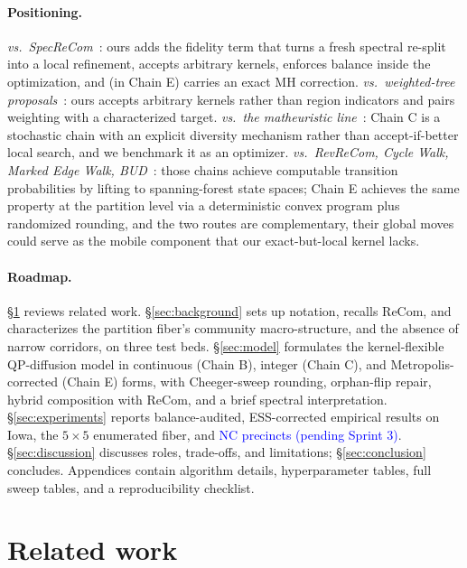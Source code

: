 \documentclass[11pt]{article}
\newcommand{\draft}[1]{\textcolor{blue}{#1}}
\begin{document}
\paragraph{Positioning.} \emph{vs.\ SpecReCom}~\cite{davies2025spectral}:
ours adds the fidelity term that turns a fresh spectral re-split into
a local refinement, accepts arbitrary kernels, enforces balance
inside the optimization, and (in Chain E) carries an exact MH
correction. \emph{vs.\ weighted-tree
proposals}~\cite{clelland2022colorado,gerrychain2024}: ours accepts
arbitrary kernels rather than region indicators and pairs weighting
with a characterized target. \emph{vs.\ the matheuristic
line}~\cite{brous2025recom,cannon2023voting}: Chain C is a stochastic
chain with an explicit diversity mechanism rather than
accept-if-better local search, and we benchmark it as an optimizer.
\emph{vs.\ RevReCom, Cycle Walk, Marked Edge Walk,
BUD}~\cite{cannon2022spanning,deford2025cycle,mcwhorter2025marked,
akitaya2026bud}: those chains achieve computable transition
probabilities by lifting to spanning-forest state spaces; Chain E
achieves the same property at the partition level via a deterministic
convex program plus randomized rounding, and the two routes are
complementary, their global moves could serve as the mobile
component that our exact-but-local kernel lacks.

\paragraph{Roadmap.}\label{sec:intro-roadmap}
\S\ref{sec:related} reviews related work. \S\ref{sec:background} sets
up notation, recalls ReCom, and characterizes the partition fiber's
community macro-structure, and the absence of narrow corridors, on three test beds.
\S\ref{sec:model} formulates the kernel-flexible QP-diffusion model in
continuous (Chain B), integer (Chain C), and Metropolis-corrected
(Chain E) forms, with Cheeger-sweep rounding, orphan-flip repair,
hybrid composition with ReCom, and a brief spectral interpretation.
\S\ref{sec:experiments} reports balance-audited, ESS-corrected
empirical results on Iowa, the $5 \times 5$ enumerated fiber, and
\draft{NC precincts (pending Sprint 3)}. \S\ref{sec:discussion}
discusses roles, trade-offs, and limitations;
\S\ref{sec:conclusion} concludes. Appendices contain algorithm
details, hyperparameter tables, full sweep tables, and a
reproducibility checklist.

\section{Related work}\label{sec:related}
\end{document}
